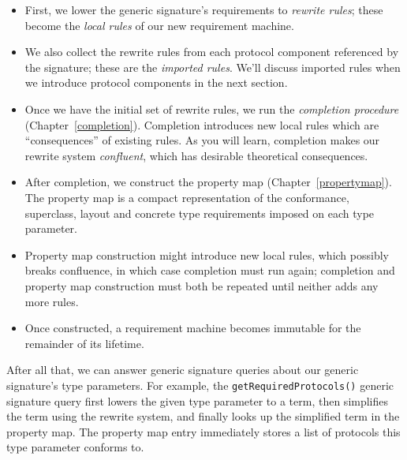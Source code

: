 \documentclass[../generics]{subfiles}
\begin{document}
\begin{itemize}
\item First, we lower the generic signature's requirements to \emph{rewrite rules}; these become the \emph{local rules} of our new requirement machine.

\item We also collect the rewrite rules from each protocol component referenced by the signature; these are the \emph{imported rules}. We'll discuss imported rules when we introduce protocol components in the next section.

\item Once we have the initial set of rewrite rules, we run the \emph{completion procedure} (Chapter~\ref{completion}). Completion introduces new local rules which are ``consequences'' of existing rules. As you will learn, completion makes our rewrite system \emph{confluent}, which has desirable theoretical consequences.

\item After completion, we construct the property map (Chapter~\ref{propertymap}). The property map is a compact representation of the conformance, superclass, layout and concrete type requirements imposed on each type parameter.

\item Property map construction might introduce new local rules, which possibly breaks confluence, in which case completion must run again; completion and property map construction must both be repeated until neither adds any more rules.

\item Once constructed, a requirement machine becomes immutable for the remainder of its lifetime.

\end{itemize}
%
%
After all that, we can answer generic signature queries about our generic signature's type parameters. For example, the \texttt{getRequiredProtocols()} generic signature query first lowers the given type parameter to a term, then simplifies the term using the rewrite system, and finally looks up the simplified term in the property map. The property map entry immediately stores a list of protocols this type parameter conforms to.
\end{document}
